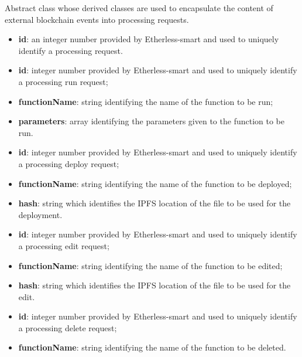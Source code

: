 	Abstract class whose derived classes are used to encapsulate the content of external blockchain events into processing requests.
	\begin{itemize}
		\item \textbf{id}: an integer number provided by Etherless-smart and used to uniquely identify a processing request.
	\end{itemize}
	\begin{itemize}
		\item \textbf{id}: integer number provided by Etherless-smart and used to uniquely identify a processing run request;
		\item \textbf{functionName}: string identifying the name of the function to be run;
		\item \textbf{parameters}: array identifying the parameters given to the function to be run.
	\end{itemize}
	\begin{itemize}
		\item \textbf{id}: integer number provided by Etherless-smart and used to uniquely identify a processing deploy request;
		\item \textbf{functionName}: string identifying the name of the function to be deployed;
		\item \textbf{hash}: string which identifies the IPFS location of the file to be used for the deployment.
	\end{itemize}
	\begin{itemize}
		\item \textbf{id}: integer number provided by Etherless-smart and used to uniquely identify a processing edit request;
		\item \textbf{functionName}: string identifying the name of the function to be edited;
		\item \textbf{hash}: string which identifies the IPFS location of the file to be used for the edit.
	\end{itemize}
	\begin{itemize}
		\item \textbf{id}: integer number provided by Etherless-smart and used to uniquely identify a processing delete request;
		\item \textbf{functionName}: string identifying the name of the function to be deleted.
	\end{itemize}

